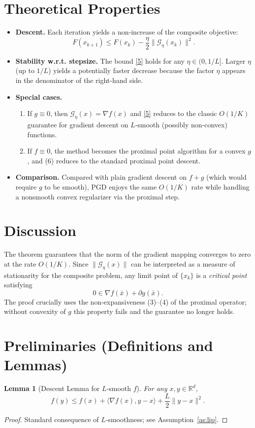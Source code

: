 \documentclass{article}
\newtheorem{lemma}{Lemma}
\newcommand{\grad}{\nabla}
\newcommand{\R}{\mathbb{R}}
\begin{document}
\section*{Theoretical Properties}
\begin{itemize}
\item \textbf{Descent.} Each iteration yields a non‑increase of the composite objective:
\[
F(x_{k+1})\le F(x_{k})-\frac{\eta}{2}\|\mathcal{G}_{\eta}(x_{k})\|^{2}. \tag{6}
\]
\item \textbf{Stability w.r.t. stepsize.} The bound \eqref{5} holds for any $\eta\in(0,1/L]$. Larger $\eta$ (up to $1/L$) yields a potentially faster decrease because the factor $\eta$ appears in the denominator of the right‑hand side.
\item \textbf{Special cases.}
\begin{enumerate}
\item If $g\equiv0$, then $\mathcal{G}_{\eta}(x)=\grad f(x)$ and \eqref{5} reduces to the classic $O(1/K)$ guarantee for gradient descent on $L$‑smooth (possibly non‑convex) functions.
\item If $f\equiv0$, the method becomes the proximal point algorithm for a convex $g$, and (6) reduces to the standard proximal point descent.
\end{enumerate}
\item \textbf{Comparison.} Compared with plain gradient descent on $f+g$ (which would require $g$ to be smooth), PGD enjoys the same $O(1/K)$ rate while handling a nonsmooth convex regularizer via the proximal step.
\end{itemize}

\section*{Discussion}
The theorem guarantees that the norm of the gradient mapping converges to zero at the rate $O(1/K)$. Since $\|\mathcal{G}_{\eta}(x)\|$ can be interpreted as a measure of stationarity for the composite problem, any limit point of $\{x_{k}\}$ is a \emph{critical point} satisfying
\[
0\in\grad f(\bar x)+\partial g(\bar x).
\]
The proof crucially uses the non‑expansiveness (3)–(4) of the proximal operator; without convexity of $g$ this property fails and the guarantee no longer holds.

\newpage
\section*{Preliminaries (Definitions and Lemmas)}
\begin{lemma}[Descent Lemma for $L$‑smooth $f$]\label{lem:descent}
For any $x,y\in\R^{d}$,
\[
f(y)\le f(x)+\langle\grad f(x),y-x\rangle+\frac{L}{2}\|y-x\|^{2}.
\]
\end{lemma}
\begin{proof}
Standard consequence of $L$‑smoothness; see Assumption~\ref{as:lip}. \qedhere
\end{proof}
\end{document}

